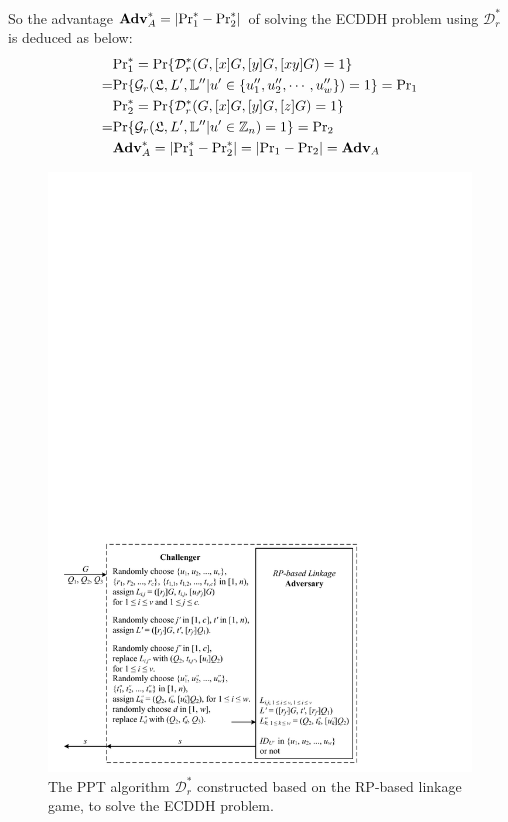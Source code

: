 So the advantage $\mathbf{Adv}^*_{A}=|{\rm Pr}^*_1 - {\rm Pr}^*_2|$ of solving the ECDDH problem using $\mathcal{D}^*_r$ is deduced as below:
\begin{align*}
&{\rm Pr}^*_1 =  {\rm Pr}\{\mathcal{D}^*_r(G, [x]G, [y]G, [xy]G)=1\} \\
=&{\rm Pr}\{\mathcal{G}_r(\mathfrak{L}, L', \mathbb{L}'' | u' \in \{{u''_1}, {u''_2}, \cdots, {u''_w}\})=1\} = {\rm Pr}_1 \\
&{\rm Pr}^*_2= {\rm Pr}\{\mathcal{D}^*_r(G, [x]G, [y]G, [z]G)=1\} \\
=&{\rm Pr}\{\mathcal{G}_r(\mathfrak{L}, L', \mathbb{L}'' | u' \in \mathbb{Z}_n)=1\} = {\rm Pr}_2\\
&\mathbf{Adv}^*_{A}=|{\rm Pr}^*_1-{\rm Pr}^*_2|=|{\rm Pr}_1-{\rm Pr}_2|={\mathbf{Adv}}_{A}
\end{align*}

\begin{figure}[tb]
  \centering
  \includegraphics[width=1.0\linewidth]{fig/rp-linkage-game.pdf}
  \caption{The PPT algorithm $\mathcal{D}^*_r$ constructed based on the RP-based linkage game, to solve the ECDDH problem.}
  \label{fig:dalgorithm}
\end{figure}


